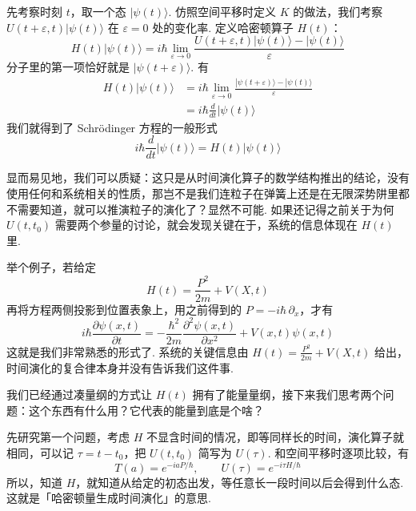 ​先考察时刻 \(t\)，取一个态 \(|\psi(t)\rangle\). 仿照空间平移时定义 \(K\) 的做法，我们考察 \(U(t+\varepsilon,t)|\psi(t)\rangle\) 在 \(\varepsilon=0\) 处的变化率. 定义哈密顿算子 \(H(t)\)：
\[
H(t)|\psi(t)\rangle
=i\hbar\lim_{\varepsilon\to0}
\frac{U(t+\varepsilon,t)|\psi(t)\rangle-|\psi(t)\rangle}{\varepsilon}
\]
分子里的第一项恰好就是 \(|\psi(t+\varepsilon)\rangle\). 有
\[
\begin{aligned}
H(t)|\psi(t)\rangle
&=i\hbar\lim_{\varepsilon\to0}
\frac{|\psi(t+\varepsilon)\rangle-|\psi(t)\rangle}{\varepsilon}\\
&=i\hbar\frac{d}{dt}|\psi(t)\rangle
\end{aligned}
\]
我们就得到了 Schrödinger 方程的一般形式
\[
i\hbar\frac{d}{dt}|\psi(t)\rangle=H(t)|\psi(t)\rangle
\]

显而易见地，我们可以质疑：这只是从时间演化算子的数学结构推出的结论，没有使用任何和系统相关的性质，那岂不是我们连粒子在弹簧上还是在无限深势阱里都不需要知道，就可以推演粒子的演化了？显然不可能. 如果还记得之前关于为何 \(U(t, t_0)\) 需要两个参量的讨论，就会发现关键在于，系统的信息体现在 \(H(t)\) 里. 

举个例子，若给定
\[
H(t)=\frac{P^2}{2m}+V(X,t)
\]
再将方程两侧投影到位置表象上，用之前得到的 \(P=-i\hbar\,\partial_x\)，才有
\[
i\hbar\frac{\partial\psi(x,t)}{\partial t}
=-\frac{\hbar^2}{2m}\frac{\partial^2\psi(x,t)}{\partial x^2}
+V(x,t)\psi(x,t)
\]
这就是我们非常熟悉的形式了. 系统的关键信息由 \(H(t)=\frac{P^2}{2m}+V(X,t)\) 给出，时间演化的复合律本身并没有告诉我们这件事.


​我们已经通过凑量纲的方式让 \(H(t)\) 拥有了能量量纲，接下来我们思考两个问题：这个东西有什么用？它代表的能量到底是个啥？

​先研究第一个问题，考虑 \(H\) 不显含时间的情况，即等同样长的时间，演化算子就相同，可以记 \(\tau=t-t_0\)，把 \(U(t,t_0)\) 简写为 \(U(\tau)\). 和空间平移时逐项比较，有
\[
T(a)=e^{-iaP/\hbar},\qquad U(\tau)=e^{-i\tau H/\hbar}
\]
所以，知道 \(H\)，就知道从给定的初态出发，等任意长一段时间以后会得到什么态. 这就是「哈密顿量生成时间演化」的意思.

